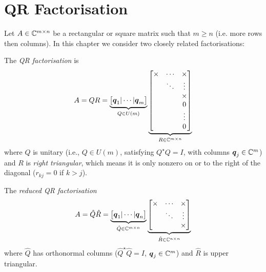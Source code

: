 
\section{QR Factorisation}
Let $A \in {\mathbb C}^{m \times n}$ be a rectangular or square matrix such that $m \ensuremath{\geq} n$ (i.e. more rows then columns). In this chapter we consider two closely related factorisations:

\begin{definition}[QR factorisation] The \emph{QR factorisation} is
\[
A = Q R = \underbrace{\begin{bmatrix} \ensuremath{\bm{\q}}_1 | \ensuremath{\cdots} | \ensuremath{\bm{\q}}_m \end{bmatrix}}_{Q \ensuremath{\in} U(m)} \underbrace{\begin{bmatrix} \ensuremath{\times} & \ensuremath{\cdots} & \ensuremath{\times} \\ & \ensuremath{\ddots} & \ensuremath{\vdots} \\ && \ensuremath{\times} \\ &&0 \\ &&\ensuremath{\vdots} \\ && 0 \end{bmatrix}}_{R \ensuremath{\in} \ensuremath{\bbC}^{m \ensuremath{\times} n}}
\]
where $Q$ is unitary (i.e., $Q \ensuremath{\in} U(m)$, satisfying $Q^\ensuremath{\star}Q = I$, with columns $\bm{{\mbox{\boldmath$q$\unboldmath}}}_j \in {\mathbb C}^m$) and $R$ is \emph{right triangular}, which means it  is only nonzero on or to the right of the diagonal ($r_{kj} = 0$ if $k > j$). \end{definition}

\begin{definition} The \emph{reduced QR factorisation}
\[
A = \hat Q \hat R = \underbrace{\begin{bmatrix} \ensuremath{\bm{\q}}_1 | \ensuremath{\cdots} | \ensuremath{\bm{\q}}_n \end{bmatrix}}_{ \hat Q \ensuremath{\in} \ensuremath{\bbC}^{m \ensuremath{\times} n}} \underbrace{\begin{bmatrix} \ensuremath{\times} & \ensuremath{\cdots} & \ensuremath{\times} \\ & \ensuremath{\ddots} & \ensuremath{\vdots} \\ && \ensuremath{\times}  \end{bmatrix}}_{\hat R \ensuremath{\in} \ensuremath{\bbC}^{n \ensuremath{\times} n}}
\]
where $\hat Q$ has orthonormal columns ($\hat Q^\ensuremath{\star} \hat Q = I$, $\bm{{\mbox{\boldmath$q$\unboldmath}}}_j \in {\mathbb C}^m$) and $\hat R$ is upper triangular. \end{definition}

